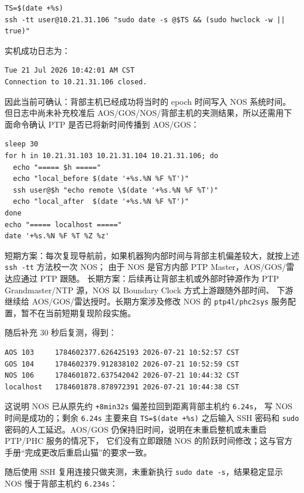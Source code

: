 \documentclass[UTF8,11pt,a4paper]{ctexart}
\begin{document}
\begin{verbatim}
TS=$(date +%s)
ssh -tt user@10.21.31.106 "sudo date -s @$TS && (sudo hwclock -w || true)"
\end{verbatim}

实机成功日志为：

\begin{verbatim}
Tue 21 Jul 2026 10:42:01 AM CST
Connection to 10.21.31.106 closed.
\end{verbatim}

因此当前可确认：背部主机已经成功将当时的 epoch 时间写入 NOS 系统时间。
但日志中尚未补充校准后 AOS/GOS/NOS/背部主机的夹测结果，所以还需用下面命令确认 PTP 是否已将新时间传播到 AOS/GOS：

\begin{verbatim}
sleep 30
for h in 10.21.31.103 10.21.31.104 10.21.31.106; do
  echo "===== $h ====="
  echo "local_before $(date '+%s.%N %F %T')"
  ssh user@$h "echo remote \$(date '+%s.%N %F %T')"
  echo "local_after  $(date '+%s.%N %F %T')"
done
echo "===== localhost ====="
date '+%s.%N %F %T %Z %z'
\end{verbatim}

短期方案：每次复现导航前，如果机器狗内部时间与背部主机偏差较大，就按上述 \texttt{ssh -tt} 方法校一次 NOS；
由于 NOS 是官方内部 PTP Master，AOS/GOS/雷达应通过 PTP 跟随。
长期方案：后续再让背部主机或外部时钟源作为 PTP Grandmaster/NTP 源，NOS 以 Boundary Clock 方式上游跟随外部时间、
下游继续给 AOS/GOS/雷达授时。长期方案涉及修改 NOS 的 \texttt{ptp4l/phc2sys} 服务配置，暂不在当前短期复现阶段实施。

随后补充 30 秒后复测，得到：

\begin{verbatim}
AOS 103     1784602377.626425193 2026-07-21 10:52:57 CST
GOS 104     1784602379.912838102 2026-07-21 10:52:59 CST
NOS 106     1784601872.637542042 2026-07-21 10:44:32 CST
localhost   1784601878.878972391 2026-07-21 10:44:38 CST
\end{verbatim}

这说明 NOS 已从原先约 \texttt{+8min32s} 偏差拉回到距离背部主机约 \texttt{6.24s}，
写 NOS 时间是成功的；剩余 \texttt{6.24s} 主要来自 \texttt{TS=\$(date +\%s)} 之后输入 SSH 密码和
\texttt{sudo} 密码的人工延迟。AOS/GOS 仍保持旧时间，说明在未重启整机或未重启 PTP/PHC 服务的情况下，
它们没有立即跟随 NOS 的阶跃时间修改；这与官方手册“完成更改后重启山猫”的要求一致。

随后使用 SSH 复用连接只做夹测，未重新执行 \texttt{sudo date -s}，结果稳定显示 NOS 慢于背部主机约
\texttt{6.234s}：
\end{document}
